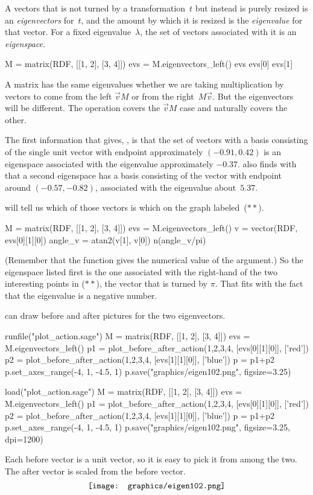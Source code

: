 A vectors that is not turned by a transformation~$t$ but instead
is purely resized 
is an \textit{eigenvectors} for~$t$, and the amount by which it is 
resized is the \textit{eigenvalue} for that vector.
For a fixed eigenvalue~$\lambda$, the set of vectors associated with
it is an \textit{eigenspace}.
\begin{sageoutput}[s,3,59,13]
M = matrix(RDF, [[1, 2], [3, 4]])
evs = M.eigenvectors_left()
evs
evs[0] 
evs[1]
\end{sageoutput}
\noindent
A matrix has the same eigenvalues whether we are taking multiplication 
by vectors to come from the left $\vec{v}M$ or from the 
right~$M\vec{v}$.  
But the eigenvectors will be different. 
The \Sage{} operation  covers the 
$\vec{v}M$ case and naturally 
covers the other.

The first information that \Sage{} gives, , 
is that the set of vectors with a basis consisting of the single unit
vector with endpoint approximately $(-0.91, 0.42)$  is an
eigenspace associated with the eigenvalue approximately $-0.37$.
\Sage{} also finds with  that a second eigenspace
has a basis consisting of the vector with endpoint around
$(-0.57, -0.82)$, associated with the
eigenvalue about~$5.37$. 

\Sage{} will tell us which of those vectors is which on the graph 
labeled~($**$).
\begin{sageoutput}
M = matrix(RDF, [[1, 2], [3, 4]])
evs = M.eigenvectors_left()
v = vector(RDF, evs[0][1][0])
angle_v = atan2(v[1], v[0]) 
n(angle_v/pi) 
\end{sageoutput}
(Remember that the  function gives the numerical value of
the argument.)
So the eigenspace listed first is the one associated with the right-hand
of the two interesting points in ($**$), the vector that is turned by
$\pi$.
That fits with the fact that the eigenvalue is a negative number.

\Sage{} can draw before and after pictures for the two eigenvectors.
\begin{sageoutput}[d,0,3]
runfile("plot_action.sage")  
M = matrix(RDF, [[1, 2], [3, 4]])
evs = M.eigenvectors_left()  
p1 = plot_before_after_action(1,2,3,4, [evs[0][1][0]], ['red']) 
p2 = plot_before_after_action(1,2,3,4, [evs[1][1][0]], ['blue']) 
p = p1+p2
p.set_axes_range(-4, 1, -4.5, 1) 
p.save("graphics/eigen102.png", figsize=3.25)
\end{sageoutput}
\begin{sagesilent}
load("plot_action.sage")  
M = matrix(RDF, [[1, 2], [3, 4]])
evs = M.eigenvectors_left()  
p1 = plot_before_after_action(1,2,3,4, [evs[0][1][0]], ['red']) 
p2 = plot_before_after_action(1,2,3,4, [evs[1][1][0]], ['blue']) 
p = p1+p2
p.set_axes_range(-4, 1, -4.5, 1) 
p.save("graphics/eigen102.png", figsize=3.25, dpi=1200)
\end{sagesilent}
\noindent
Each before vector is a unit vector, so it is easy to pick it from among the
two.
The after vector is scaled from the before vector.
\begin{equation*}
  \vcenteredhbox{\texttt{[image: graphics/eigen102.png]}}
\end{equation*}


